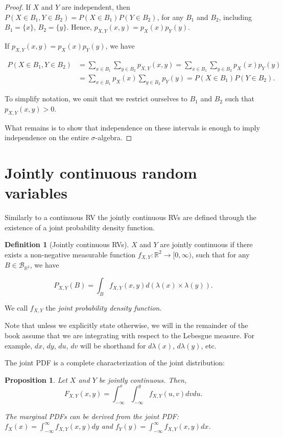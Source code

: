 \documentclass{book}
\theoremstyle{plain}%
\newtheorem{proposition}{Proposition}[section]
\theoremstyle{definition}
\newtheorem{definition}{Definition}[section]
\newlength{\arrow}
\begin{document}
\begin{proof}
If $X$ and $Y$ are independent, then $P(X \in B_1, Y \in B_2) = P(X \in B_1)P(Y \in B_2)$, for any $B_1$ and $B_2$, including $B_1 = \{x\}$, $B_2 = \{y\}$. Hence, $p_{X,Y}(x,y) = p_X(x)p_Y(y)$.

If $p_{X,Y}(x,y) = p_X(x)p_Y(y)$, we have 

\begin{align*}
P(X \in B_1, Y \in B_2) &= \sum_{x \in B_1} \sum_{y \in B_2} p_{X,Y}(x,y) = \sum_{x \in B_1} \sum_{y \in B_2} p_{X}(x)p_{Y}(y)\\
&=\sum_{x \in B_1} p_{X}(x) \sum_{y \in B_2} p_{Y}(y) = P(X \in B_1)P(Y \in B_2).
\end{align*}

To simplify notation, we omit that we restrict ourselves to $B_1$ and $B_2$ such that $p_{X,Y}(x,y) > 0$.

What remains is to show that independence on these intervals is enough to imply independence on the entire $\sigma$-algebra.

\end{proof}

\section{Jointly continuous random variables}

Similarly to a continuous RV the jointly continuous RVs are defined through the existence of a joint probability density function.

\begin{definition}[Jointly continuous RVs]
$X$ and $Y$ are jointly continuous if there exists a non-negative measurable function $f_{X,Y}:\mathbb{R}^2 \rightarrow [0, \infty)$, such that for any $B \in \mathcal{B}_{\mathbb{R}^2}$, we have 

$$P_{X,Y}(B) = \int_{B} f_{X,Y}(x, y) d(\lambda(x) \times \lambda(y)).$$

We call $f_{X,Y}$ the \emph{joint probability density function}.
\end{definition}

Note that unless we explicitly state otherwise, we will in the remainder of the book assume that we are integrating with respect to the Lebesgue measure. For example, $dx$, $dy$, $du$, $dv$ will be shorthand for $d\lambda(x)$, $d\lambda(y)$, etc.

The joint PDF is a complete characterization of the joint distribution:

\begin{proposition}
Let $X$ and $Y$ be jointly continuous. Then,
$$F_{X,Y}(x,y) = \int_{-\infty}^x \int_{-\infty}^y f_{X,Y}(u,v)dvdu.$$

The marginal PDFs can be derived from the joint PDF: $f_X(x) = \int_{-\infty}^\infty f_{X,Y}(x,y)dy$ and $f_Y(y) = \int_{-\infty}^\infty f_{X,Y}(x,y)dx$.
\end{proposition}
\end{document}
